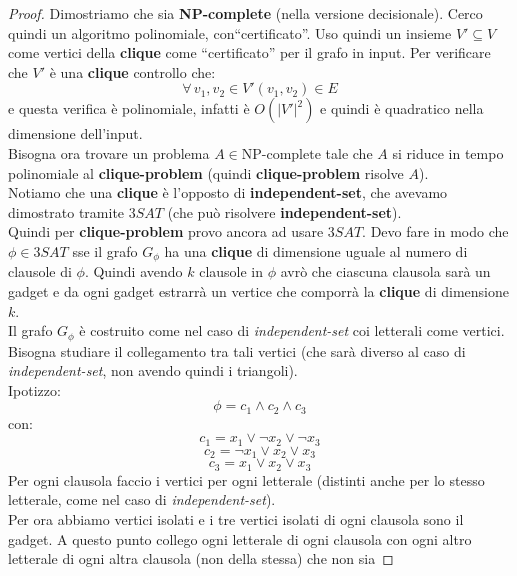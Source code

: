 										\begin{proof}
											Dimostriamo che sia \textbf{NP-complete} (nella versione decisionale). Cerco
											quindi un algoritmo 
											polinomiale, con``certificato''. Uso quindi un insieme $V'\subseteq V$ come
											vertici della \textbf{clique} come ``certificato'' per il grafo in input. Per
											verificare che $V'$ è una \textbf{clique} controllo che:
											\[\forall\,v_1,v_2\in    V' (v_1,v_2)\in E\]
											e questa verifica è polinomiale, infatti è $O(|V'|^2)$ e
											quindi è quadratico nella dimensione dell'input.\\
											Bisogna ora trovare un problema $A\in \mbox{NP-complete}$ tale che $A$ si
											riduce in tempo polinomiale al \textbf{clique-problem} (quindi
											\textbf{clique-problem} risolve $A$).  \\
											Notiamo che una \textbf{clique} è l'opposto di \textbf{independent-set}, che
											avevamo dimostrato tramite $3SAT$ (che può risolvere
											\textbf{independent-set}).\\
											Quindi per \textbf{clique-problem} provo ancora ad usare $3SAT$. Devo fare in
											modo che $\phi\in 3SAT$ sse il grafo $G_\phi$ ha una \textbf{clique} di
											dimensione uguale al numero di clausole di $\phi$. Quindi avendo $k$ clausole
											in $\phi$ avrò che ciascuna clausola sarà un gadget e da ogni gadget estrarrà
											un vertice che comporrà la \textbf{clique} di dimensione $k$.\\
											Il grafo $G_\phi$ è costruito come nel caso di \textit{independent-set} coi
											letterali come vertici.\\
											Bisogna studiare il collegamento tra tali vertici (che sarà diverso al caso di
											\textit{independent-set}, non avendo quindi i triangoli).\\
											Ipotizzo:
											\[\phi=c_1\land c_2\land c_3\]
											con:
											\[c_1=x_1\lor \neg x_2\lor \neg x_3\]
											\[c_2=\neg x_1\lor x_2\lor x_3\]
											\[c_3=x_1\lor x_2\lor x_3\]
											Per ogni clausola faccio i vertici per ogni letterale (distinti anche per lo
											stesso letterale, come nel caso di \textit{independent-set}).\\
											Per ora abbiamo vertici isolati e i tre vertici isolati di ogni clausola sono
											il gadget. A questo punto collego ogni letterale di ogni clausola con ogni
											altro letterale di ogni altra clausola (non della stessa) che non sia

\end{proof}
